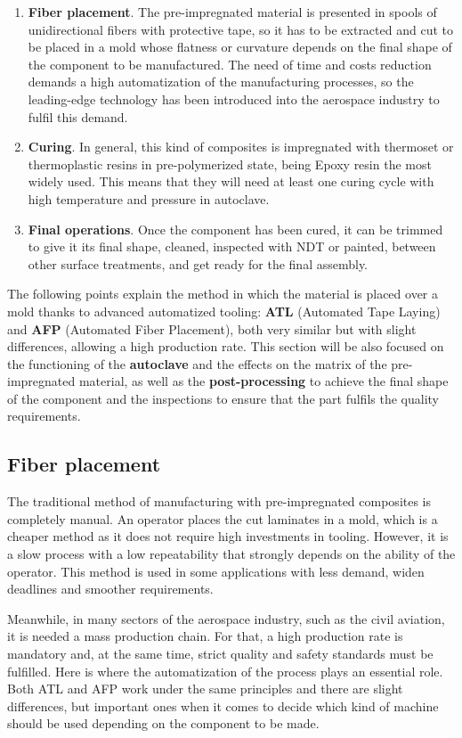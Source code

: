 \begin{enumerate}
\item\textbf{Fiber placement}. The pre-impregnated material is presented in spools of unidirectional fibers with protective tape, so it has to be extracted and cut to be placed in a mold whose flatness or curvature depends on the final shape of the component to be manufactured. The need of time and costs reduction demands a high automatization of the manufacturing processes, so the leading-edge technology has been introduced into the aerospace industry to fulfil this demand.
\item\textbf{Curing}. In general, this kind of composites is impregnated with thermoset or thermoplastic resins in pre-polymerized state, being Epoxy resin the most widely used. This means that they will need at least one curing cycle with high temperature and pressure in autoclave.
\item\textbf{Final operations}. Once the component has been cured, it can be trimmed to give it its final shape, cleaned, inspected with NDT or painted, between other surface treatments, and get ready for the final assembly.
\end{enumerate}

The following points explain the method in which the material is placed over a mold thanks to advanced automatized tooling: \textbf{ATL} (Automated Tape Laying) and \textbf{AFP} (Automated Fiber Placement), both very similar but with slight differences, allowing a high production rate. This section will be also focused on the functioning of the \textbf{autoclave} and the effects on the matrix of the pre-impregnated material, as well as the \textbf{post-processing} to achieve the final shape of the component and the inspections to ensure that the part fulfils the quality requirements.

\subsection{Fiber placement}

The traditional method of manufacturing with pre-impregnated composites is completely manual. An operator places the cut laminates in a mold, which is a cheaper method as it does not require high investments in tooling. However, it is a slow process with a low repeatability that strongly depends on the ability of the operator. This method is used in some applications with less demand, widen deadlines and smoother requirements.

Meanwhile, in many sectors of the aerospace industry, such as the civil aviation, it is needed a mass production chain. For that, a high production rate is mandatory and, at the same time, strict quality and safety standards must be fulfilled. Here is where the automatization of the process plays an essential role. Both ATL and AFP work under the same principles and there are slight differences, but important ones when it comes to decide which kind of machine should be used depending on the component to be made.

